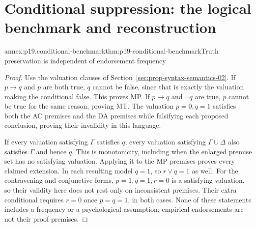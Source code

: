 \section{Conditional suppression: the logical benchmark and reconstruction}
\label{sec:annex-p19-conditional-suppression}

\begin{annexitem}{annex:p19.conditional-benchmark}{thm:p19-conditional-benchmark}{Truth preservation is independent of endorsement frequency}
\begin{proof}
Use the valuation clauses of Section~\ref{sec:prop-syntax-semantics-02}. If \(p\to q\)
and \(p\) are both true, \(q\) cannot be false, since that is exactly
the valuation making the conditional false. This proves MP. If
\(p\to q\) and \(\neg q\) are true, \(p\) cannot be true for the
same reason, proving MT. The valuation \(p=0,q=1\) satisfies both
the AC premises and the DA premises while falsifying each proposed
conclusion, proving their invalidity in this language.

If every valuation satisfying \(\Gamma\) satisfies \(q\), every
valuation satisfying \(\Gamma\cup\Delta\) also satisfies \(\Gamma\)
and hence \(q\). This is monotonicity, including when the enlarged
premise set has no satisfying valuation. Applying it to the MP premises
proves every claimed extension. In each resulting model \(q=1\), so
\(r\lor q=1\) as well. For the contravening and conjunctive forms,
\(p=1,q=1,r=0\) is a satisfying valuation, so their validity here
does not rest only on inconsistent premises. Their extra conditional
requires \(r=0\) once \(p=q=1\), in both cases.
None of these statements includes a frequency or a psychological
assumption; empirical endorsements are not their proof premises.
\end{proof}
\end{annexitem}

